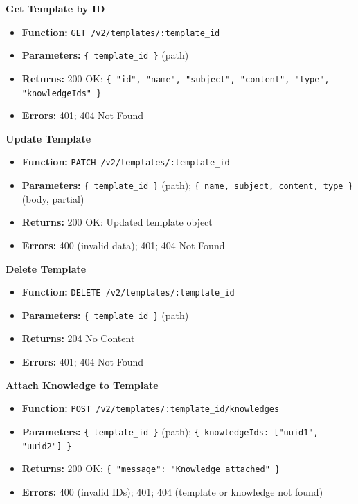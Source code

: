 \documentclass[a4paper]{article}
\begin{document}
\textbf{Get Template by ID}
\begin{itemize}
  \item \textbf{Function:} \texttt{GET /v2/templates/:template\_id}
  \item \textbf{Parameters:} \texttt{\{ template\_id \}} (path)
  \item \textbf{Returns:} 200 OK: \texttt{\{ "id", "name", "subject", "content", "type", "knowledgeIds" \}}
  \item \textbf{Errors:} 401; 404 Not Found
\end{itemize}

\textbf{Update Template}
\begin{itemize}
  \item \textbf{Function:} \texttt{PATCH /v2/templates/:template\_id}
  \item \textbf{Parameters:} \texttt{\{ template\_id \}} (path); \texttt{\{ name, subject, content, type \}} (body, partial)
  \item \textbf{Returns:} 200 OK: Updated template object
  \item \textbf{Errors:} 400 (invalid data); 401; 404 Not Found
\end{itemize}

\textbf{Delete Template}
\begin{itemize}
  \item \textbf{Function:} \texttt{DELETE /v2/templates/:template\_id}
  \item \textbf{Parameters:} \texttt{\{ template\_id \}} (path)
  \item \textbf{Returns:} 204 No Content
  \item \textbf{Errors:} 401; 404 Not Found
\end{itemize}

\textbf{Attach Knowledge to Template}
\begin{itemize}
  \item \textbf{Function:} \texttt{POST /v2/templates/:template\_id/knowledges}
  \item \textbf{Parameters:} \texttt{\{ template\_id \}} (path); \texttt{\{ knowledgeIds: ["uuid1", "uuid2"] \}}
  \item \textbf{Returns:} 200 OK: \texttt{\{ "message": "Knowledge attached" \}}
  \item \textbf{Errors:} 400 (invalid IDs); 401; 404 (template or knowledge not found)
\end{itemize}

\end{document}
